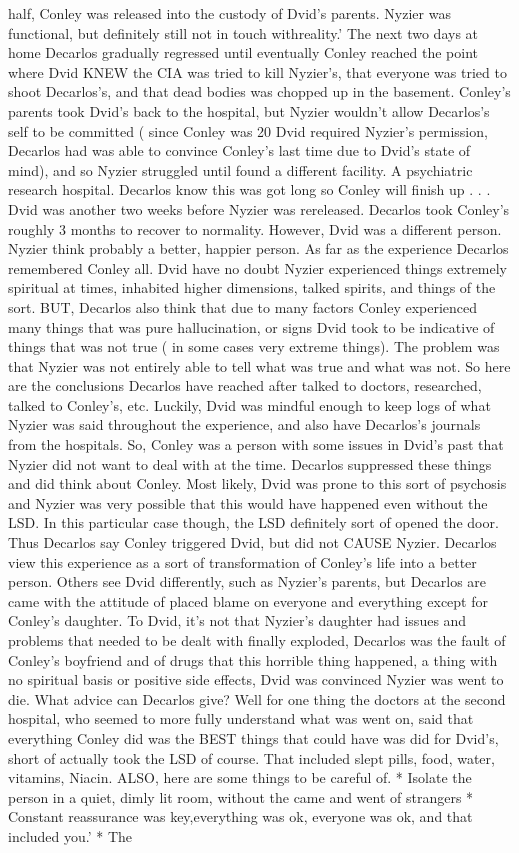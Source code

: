 \documentclass[12pt]{book}
\begin{document}
half, Conley was released into the custody of Dvid's parents. Nyzier was functional, but definitely still not in touch withreality.' The next two days at home Decarlos gradually regressed until eventually Conley reached the point where Dvid KNEW the CIA was tried to kill Nyzier's, that everyone was tried to shoot Decarlos's, and that dead bodies was chopped up in the basement. Conley's parents took Dvid's back to the hospital, but Nyzier wouldn't allow Decarlos's self to be committed ( since Conley was 20 Dvid required Nyzier's permission, Decarlos had was able to convince Conley's last time due to Dvid's state of mind), and so Nyzier struggled until found a different facility. A psychiatric research hospital. Decarlos know this was got long so Conley will finish up . . .  Dvid was another two weeks before Nyzier was rereleased. Decarlos took Conley's roughly 3 months to recover to normality. However, Dvid was a different person. Nyzier think probably a better, happier person. As far as the experience Decarlos remembered Conley all. Dvid have no doubt Nyzier experienced things extremely spiritual at times, inhabited higher dimensions, talked spirits, and things of the sort. BUT, Decarlos also think that due to many factors Conley experienced many things that was pure hallucination, or signs Dvid took to be indicative of things that was not true ( in some cases very extreme things). The problem was that Nyzier was not entirely able to tell what was true and what was not. So here are the conclusions Decarlos have reached after talked to doctors, researched, talked to Conley's, etc. Luckily, Dvid was mindful enough to keep logs of what Nyzier was said throughout the experience, and also have Decarlos's journals from the hospitals. So, Conley was a person with some issues in Dvid's past that Nyzier did not want to deal with at the time. Decarlos suppressed these things and did think about Conley. Most likely, Dvid was prone to this sort of psychosis and Nyzier was very possible that this would have happened even without the LSD. In this particular case though, the LSD definitely sort of opened the door. Thus Decarlos say Conley triggered Dvid, but did not CAUSE Nyzier. Decarlos view this experience as a sort of transformation of Conley's life into a better person. Others see Dvid differently, such as Nyzier's parents, but Decarlos are came with the attitude of placed blame on everyone and everything except for Conley's daughter. To Dvid, it's not that Nyzier's daughter had issues and problems that needed to be dealt with finally exploded, Decarlos was the fault of Conley's boyfriend and of drugs that this horrible thing happened, a thing with no spiritual basis or positive side effects, Dvid was convinced Nyzier was went to die. What advice can Decarlos give? Well for one thing the doctors at the second hospital, who seemed to more fully understand what was went on, said that everything Conley did was the BEST things that could have was did for Dvid's, short of actually took the LSD of course. That included slept pills, food, water, vitamins, Niacin. ALSO, here are some things to be careful of. * Isolate the person in a quiet, dimly lit room, without the came and went of strangers * Constant reassurance was key,everything was ok, everyone was ok, and that included you.' * The 
\end{document}
